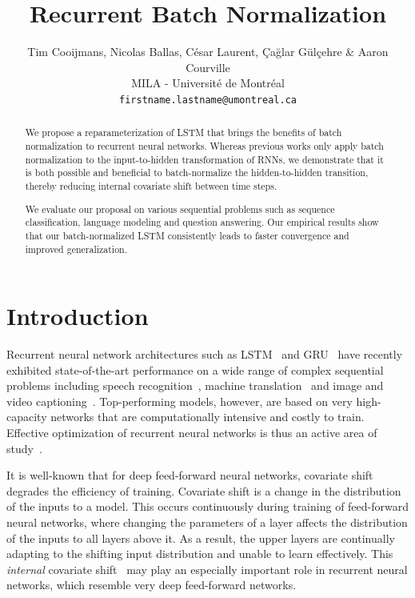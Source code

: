 \documentclass{article} %
\title{Recurrent Batch Normalization}
\author{
Tim Cooijmans, Nicolas Ballas, C\'esar Laurent, Çağlar Gülçehre \& Aaron Courville \\
MILA - Universit\'e de Montr\'eal \\
\texttt{firstname.lastname@umontreal.ca} \\
}
\begin{document}
\maketitle

\begin{abstract}
We propose a reparameterization of LSTM that brings the benefits of batch normalization to recurrent neural networks.
Whereas previous works only apply batch normalization to the input-to-hidden transformation of RNNs,
we demonstrate that it is both possible and beneficial to batch-normalize the hidden-to-hidden transition,
thereby reducing internal covariate shift between time steps.

We evaluate our proposal on various sequential problems such as sequence classification, language modeling and question answering.
Our empirical results show that our batch-normalized LSTM consistently leads to faster convergence and improved generalization.
\end{abstract}

\section{Introduction}

Recurrent neural network architectures such as LSTM~\citep{lstm} and GRU~\citep{cho2014learning} have recently exhibited
state-of-the-art performance on a wide range of complex sequential problems including speech recognition~\cite{baidu},
machine translation~\citep{bahdanau2014neural} and image and video captioning~\citep{xu2015show,yao2015describing}.
Top-performing models, however, are based on very high-capacity networks that are computationally intensive and costly to train.
Effective optimization of recurrent neural networks is thus an active area of study~\citep{pascanudifficulty,hessianfree,ollivier}.

It is well-known that for deep feed-forward neural networks, covariate
shift~\citep{shimodaira2000improving,batchnorm} degrades the efficiency of training.  Covariate
shift is a change in the distribution of the inputs to a model.  This occurs continuously during
training of feed-forward neural networks, where changing the parameters of a layer affects the
distribution of the inputs to all layers above it.  As a result, the upper layers are continually
adapting to the shifting input distribution and unable to learn effectively.  This \emph{internal}
covariate shift~\citep{batchnorm} may play an especially important role in recurrent neural
networks, which resemble very deep feed-forward networks.
\end{document}
